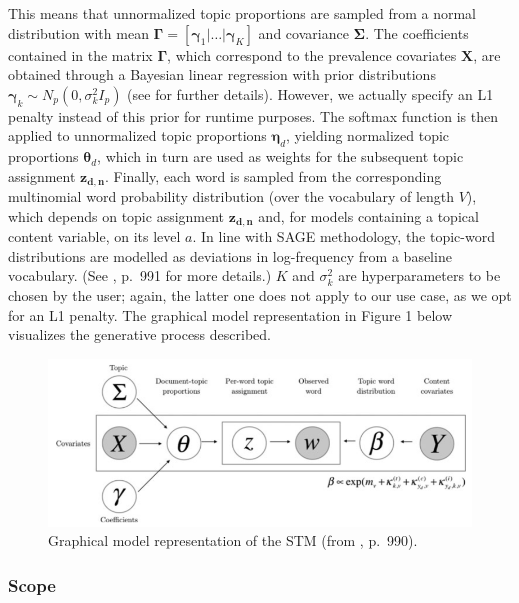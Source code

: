 \noindent
This means that unnormalized topic proportions are sampled from a normal distribution with mean $\boldsymbol{\Gamma} = [\boldsymbol{\gamma}_1|\dots|\boldsymbol{\gamma}_K]$ and covariance $\boldsymbol{\Sigma}$. The coefficients contained in the matrix $\boldsymbol{\Gamma}$, which correspond to the prevalence covariates $\boldsymbol{X}$, are obtained through a Bayesian linear regression with prior distributions $\boldsymbol{\gamma}_k \sim N_p(0, \sigma_k^2I_p)$ (see \citealp{roberts2016model} for further details). However, we actually specify an L1 penalty instead of this prior for runtime purposes. The softmax function is then applied to unnormalized topic proportions $\boldsymbol{\eta}_d$, yielding normalized topic proportions $\boldsymbol{\theta}_d$, which in turn are used as weights for the subsequent topic assignment $\boldsymbol{z_{d,n}}$. Finally, each word is sampled from the corresponding multinomial word probability distribution (over the vocabulary of length $V$), which depends on topic assignment $\boldsymbol{z_{d,n}}$ and, for models containing a topical content variable, on its level $a$. In line with SAGE methodology, the topic-word distributions are modelled as deviations in log-frequency from a baseline vocabulary. (See \citealp{roberts2016model}, p.\ 991 for more details.) $K$ and $\sigma_k^2$ are hyperparameters to be chosen by the user; again, the latter one does not apply to our use case, as we opt for an L1 penalty. The graphical model representation in Figure 1 below visualizes the generative process described.


\begin{figure}[h!]
  \centering
  \captionsetup{justification=centering,margin=2cm}
  \includegraphics[scale = 0.5]{../plots/2/stm_graphical.png}
  \caption{Graphical model representation of the STM (from \cite{roberts2016model}, p.\ 990).}
  \label{fig:graphical_model}
\end{figure}

\subsubsection*{Scope}

